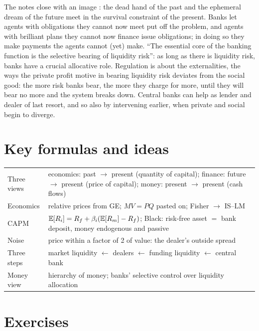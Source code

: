 \begin{paracol}{2}
\begin{intuition}
The notes close with an image : the dead hand of the past and the ephemeral dream of the future meet in the survival constraint of the present. Banks let agents with obligations
they cannot now meet put off the problem, and agents with brilliant plans they cannot now finance issue obligations; in doing so they make payments the agents cannot (yet) make. ``The essential
core of the banking function is the selective bearing of liquidity risk'': as long as there is liquidity risk, banks have a crucial allocative role. Regulation is about the externalities, the
ways the private profit motive in bearing liquidity risk deviates from the social good: the more risk banks bear, the more they charge for more, until they will bear no more and the system breaks
down. Central banks can help as lender and dealer of last resort, and so also by intervening earlier, when private and social begin to diverge.
\end{intuition}

\flushside
\section*{Key formulas and ideas}
\begin{keyformulas}
\begin{tabularx}{\linewidth}{@{}l L@{}}
Three views & economics: past $\to$ present (quantity of capital); finance: future $\to$ present (price of capital); money: present $\to$ present (cash flows)\\
Economics & relative prices from GE; $MV=PQ$ pasted on; Fisher $\to$ IS--LM\\
CAPM & $\mathbb{E}[R_i]=R_f+\beta_i(\mathbb{E}[R_m]-R_f)$; Black: risk-free asset $=$ bank deposit, money endogenous and passive\\
Noise & price within a factor of 2 of value: the dealer's outside spread\\
Three steps & market liquidity $\leftarrow$ dealers $\leftarrow$ funding liquidity $\leftarrow$ central bank\\
Money view & hierarchy of money; banks' selective control over liquidity allocation\\
\end{tabularx}
\end{keyformulas}

\section*{Exercises}


\end{paracol}
